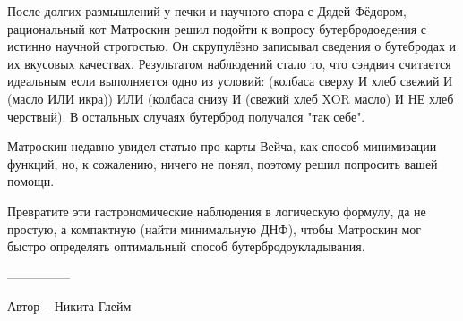 \question
После долгих размышлений у печки и научного спора с Дядей Фёдором, рациональный кот Матроскин решил подойти к вопросу бутербродоедения с истинно научной строгостью. Он скрупулёзно записывал сведения о бутебродах и их вкусовых качествах. Результатом наблюдений стало то, что сэндвич считается идеальным если выполняется одно из условий: (колбаса сверху И хлеб свежий И (масло ИЛИ икра)) ИЛИ (колбаса снизу И (свежий хлеб XOR масло) И НЕ хлеб черствый). В остальных случаях бутерброд получался "так себе". 

Матроскин недавно увидел статью про карты Вейча, как способ минимизации функций, но, к сожалению, ничего не понял, поэтому решил попросить вашей помощи.

Превратите эти гастрономические наблюдения в логическую формулу, да не простую, а компактную (найти минимальную ДНФ), чтобы Матроскин мог быстро определять оптимальный способ бутербродоукладывания.

---------------

Автор -- Никита Глейм